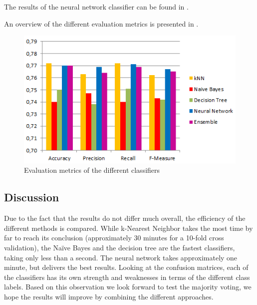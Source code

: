 The results of the neural network classifier can be found in .
\begin{table}[H]
	\centering
	\caption{Confusion matrix of the Neural Network}
	\label{tab:mat-nn}
\end{table}

An overview of the different evaluation metrics is presented in .
\begin{figure}[H]
	\centering
	\includegraphics[width=\columnwidth]{../../charts/results.png}
	\caption{Evaluation metrics of the different classifiers}
	\label{fig:result}
\end{figure}

\subsection{Discussion}
Due to the fact that the results do not differ much overall, the efficiency of the different methods is compared. While k-Nearest Neighbor takes the most time by far to reach its conclusion (approximately 30 minutes for a 10-fold cross validation), the Na\"ive Bayes and the decision tree are the fastest classifiers, taking only less than a second. The neural network takes approximately one minute, but delivers the best results. Looking at the confusion matrices, each of the classifiers has its own strength and weaknesses in terms of the different class labels. Based on this observation we look forward to test the majority voting, we hope the results will improve by combining the different approaches. 

